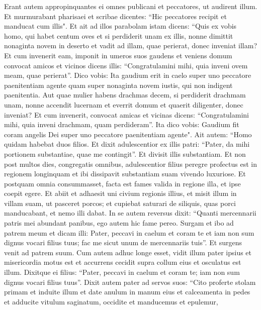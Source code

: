 \begin{biblechapter}  
\verse Erant autem appropinquantes ei omnes publicani et peccatores, ut audirent illum. 
\verse Et murmurabant pharisaei et scribae dicentes: “Hic peccatores recipit et manducat cum illis". 
\verse Et ait ad illos parabolam istam dicens: 
\verse “Quis ex vobis homo, qui habet centum oves et si perdiderit unam ex illis, nonne dimittit nonaginta novem in deserto et vadit ad illam, quae perierat, donec inveniat illam? 
\verse Et cum invenerit eam, imponit in umeros suos gaudens 
\verse et veniens domum convocat amicos et vicinos dicens illis: “Congratulamini mihi, quia inveni ovem meam, quae perierat”. 
\verse Dico vobis: Ita gaudium erit in caelo super uno peccatore paenitentiam agente quam super nonaginta novem iustis, qui non indigent paenitentia. 
\verse Aut quae mulier habens drachmas decem, si perdiderit drachmam unam, nonne accendit lucernam et everrit domum et quaerit diligenter, donec inveniat? 
\verse Et cum invenerit, convocat amicas et vicinas dicens: “Congratulamini mihi, quia inveni drachmam, quam perdideram”. 
\verse Ita dico vobis: Gaudium fit coram angelis Dei super uno peccatore paenitentiam agente". 
\verse Ait autem: “Homo quidam habebat duos filios. 
\verse Et dixit adulescentior ex illis patri: “Pater, da mihi portionem substantiae, quae me contingit”. Et divisit illis substantiam. 
\verse Et non post multos dies, congregatis omnibus, adulescentior filius peregre profectus est in regionem longinquam et ibi dissipavit substantiam suam vivendo luxuriose. 
\verse Et postquam omnia consummasset, facta est fames valida in regione illa, et ipse coepit egere.  
\verse Et abiit et adhaesit uni civium regionis illius, et misit illum in villam suam, ut pasceret porcos; 
\verse et cupiebat saturari de siliquis, quas porci manducabant, et nemo illi dabat. 
\verse In se autem reversus dixit: “Quanti mercennarii patris mei abundant panibus, ego autem hic fame pereo. 
\verse Surgam et ibo ad patrem meum et dicam illi: Pater, peccavi in caelum et coram te 
\verse et iam non sum dignus vocari filius tuus; fac me sicut unum de mercennariis tuis”. 
\verse Et surgens venit ad patrem suum. Cum autem adhuc longe esset, vidit illum pater ipsius et misericordia motus est et accurrens cecidit supra collum eius et osculatus est illum. 
\verse Dixitque ei filius: “Pater, peccavi in caelum et coram te; iam non sum dignus vocari filius tuus”. 
\verse Dixit autem pater ad servos suos: “Cito proferte stolam primam et induite illum et date anulum in manum eius et calceamenta in pedes  
\verse et adducite vitulum saginatum, occidite et manducemus et epulemur, 

\end{biblechapter}
